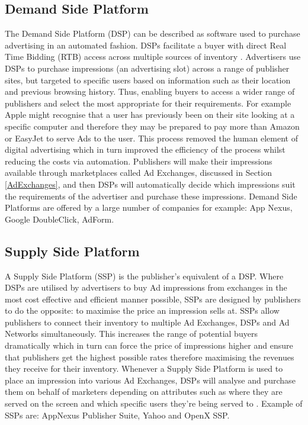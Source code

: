 \documentclass[12pt]{article}
\begin{document}
\subsection{Demand Side Platform} \label{DSP}
The Demand Side Platform (DSP) can be described as software used to purchase advertising in an automated fashion. DSPs facilitate a buyer with direct Real Time Bidding (RTB) access across multiple sources of inventory \parencite{introDSP}. Advertisers use DSPs to purchase impressions (an advertising slot) across a range of publisher sites, but targeted to specific users based on information such as their location and previous browsing history. Thus, enabling buyers to access a wider range of publishers and select the most appropriate for their requirements. For example Apple might recognise that a user has previously been on their site looking at a specific computer and therefore they may be prepared to pay more than Amazon or EasyJet to serve Ads to the user. This process removed the human element of digital advertising which in turn improved the efficiency of the process whilst reducing the costs via automation. Publishers will make their impressions available through marketplaces called Ad Exchanges, discussed in Section \ref{AdExchanges}, and then DSPs will automatically decide which impressions suit the requirements of the advertiser and purchase these impressions. Demand Side Platforms are offered by a large number of companies for example: App Nexus, Google DoubleClick, AdForm. 

\subsection{Supply Side Platform} \label{SSP}
A Supply Side Platform (SSP) is the publisher's equivalent of a DSP. Where DSPs are utilised by advertisers to buy Ad impressions from exchanges in the most cost effective and efficient manner possible, SSPs are designed by publishers to do the opposite: to maximise the price an impression sells at. SSPs allow publishers to connect their inventory to multiple Ad Exchanges, DSPs and Ad Networks simultaneously. This increases the range of potential buyers dramatically which in turn can force the price of impressions higher and ensure that publishers get the highest possible rates therefore maximising the revenues they receive for their inventory. Whenever a Supply Side Platform is used to place an impression into various Ad Exchanges, DSPs will analyse and purchase them on behalf of marketers depending on attributes such as where they are served on the screen and which specific users they're being served to \parencite{introDSP}. Example of SSPs are: AppNexus Publisher Suite, Yahoo and OpenX SSP.  
\end{document}
